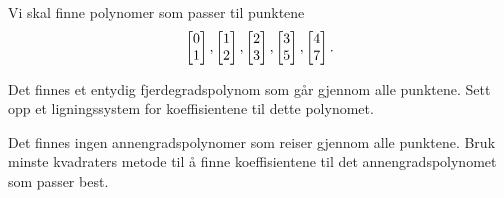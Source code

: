 



%

\begin{oppgave}
Vi skal finne polynomer som passer til punktene
$$\begin{bmatrix} 0 \\ 1 \end{bmatrix}, \begin{bmatrix} 1 \\ 2 \end{bmatrix}, \begin{bmatrix} 2 \\ 3 \end{bmatrix},\begin{bmatrix} 3 \\ 5 \end{bmatrix},\begin{bmatrix} 4 \\ 7 \end{bmatrix}.$$

\begin{punkt}
Det finnes et entydig fjerdegradspolynom  som går gjennom alle punktene. Sett opp et ligningssystem for koeffisientene til dette polynomet. 
\end{punkt}

\begin{punkt}
Det finnes ingen annengradspolynomer som reiser gjennom alle punktene. Bruk minste kvadraters metode til å finne koeffisientene til det annengradspolynomet som passer best.
\end{punkt}
\end{oppgave}


